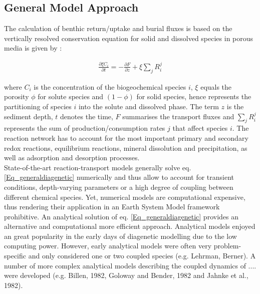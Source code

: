 \documentclass[gmd, manuscript]{copernicus}
\begin{document}
\subsection {General Model Approach}
The calculation of benthic return/uptake and burial fluxes is based on the vertically resolved conservation equation for solid and dissolved species in porous media is given by  \citep[e.g.][]{Boudreau:1997}:

\begin{eqnarray}
\frac{\partial \xi C_i}{\partial t}=-\frac{\partial F}{\partial z}+\xi \sum_j R_i^j \label{Eq_generaldiagenetic}
\end{eqnarray}

where $C_i$ is the concentration of the biogeochemical species $i$, $\xi$ equals the porosity $\phi$ for solute species and $(1-\phi)$ for solid species, hence represents the partitioning of species $i$ into the solute 
and dissolved phase. The term $z$ is the sediment depth, $t$ denotes the time, $F$ summarises the transport fluxes and $\sum_j R_i^j$ represents the sum of production/consumption rates $j$ that affect species $i$. 
The reaction network has to account for the most important primary and secondary redox reactions, equilibrium reactions, mineral dissolution and precipitation, as well as adsorption and desorption processes.\\

State-of-the-art reaction-transport models generally solve eq. \ref{Eq_generaldiagenetic} numerically and thus allow to account for transient conditions, depth-varying parameters or a high degree of coupling between different 
chemical species. Yet, numerical models are computational expensive, thus rendering their application in an Earth System Model framework prohibitive. An analytical solution of eq. \ref{Eq_generaldiagenetic} provides an 
alternative and computational more efficient approach. Analytical models enjoyed an great popularity in the early days of diagenetic modelling due to the low computing power. 
However, early analytical models were often very problem-specific and only considered one or two coupled species  (e.g. Lehrman, Berner). A number of more complex analytical models describing the coupled dynamics of ....
were developed (e.g. Billen, 1982, Goloway and Bender, 1982 and Jahnke et al., 1982). 
\end{document}
